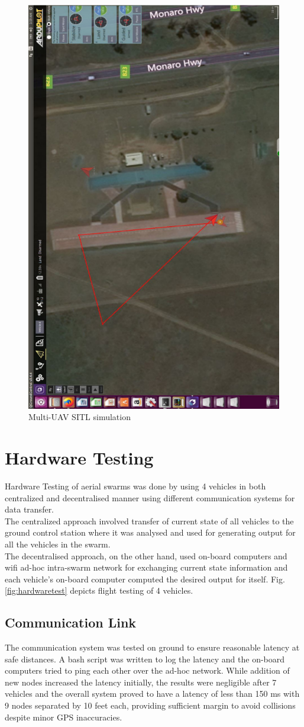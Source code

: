\begin{spacing}{2}
\begin{figure}
    \includegraphics[height = \linewidth, angle=270]{image/sitlmultiUAVQGC.png}
    \caption{Multi-UAV SITL simulation}
    \label{fig:qgc}
\end{figure}
\section{Hardware Testing}
Hardware Testing of aerial swarms was done by using 4 vehicles in both centralized and decentralised manner using different communication systems for data transfer. \\The centralized approach involved transfer of current state of all vehicles to the ground control station where it was analysed and used for generating output for all the vehicles in the swarm. \\ The decentralised approach, on the other hand, used on-board computers and wifi ad-hoc intra-swarm network for exchanging current state information and each vehicle's on-board computer computed the desired output for itself. Fig. \ref{fig:hardwaretest} depicts flight testing of 4 vehicles.
\subsection{Communication Link}
The communication system was tested on ground to ensure reasonable latency at safe distances. A bash script was written to log the latency and the on-board computers tried to ping each other over the ad-hoc network. While addition of new nodes increased the latency initially, the results were negligible after 7 vehicles and the overall system proved to have a latency of less than 150 ms with 9 nodes separated by 10 feet each, providing sufficient margin to avoid collisions despite minor GPS inaccuracies. 


\end{spacing}
